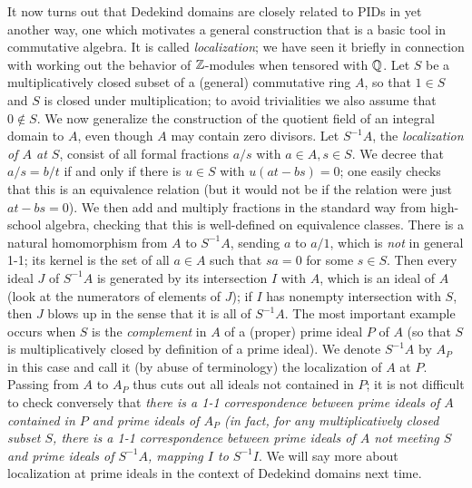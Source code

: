 \documentclass[10pt]{article}
\begin{document}
It now turns out that Dedekind domains are closely related to PIDs in
yet another way, one which motivates a general construction that is a
basic tool in commutative algebra. It is called {\sl localization}; we
have seen it briefly in connection with working out the behavior of
$\Bbb Z$-modules when tensored with $\Bbb Q$. Let $S$ be a
multiplicatively closed subset of a (general) commutative ring $A$, so
that $1\in S$ and $S$ is closed under multiplication; to avoid
trivialities we also assume that $0\notin S$. We now generalize the
construction of the quotient field of an integral domain to $A$, even
though $A$ may contain zero divisors. Let $S^{-1}A$, the {\sl
  localization of $A$ at $S$}, consist of all formal fractions $a/s$
with $a\in A, s\in S$. We decree that $a/s = b/t$ if and only if there
is $u\in S$ with $u(at - bs) = 0$; one easily checks that this is an
equivalence relation (but it would not be if the relation were just $at
- bs = 0$). We then add and multiply fractions in the standard way from
high-school algebra, checking that this is well-defined on equivalence
classes. There is a natural homomorphism from $A$ to $S^{-1}A$, sending
$a$ to $a/1$, which is {\sl not} in general 1-1; its kernel is the set
of all $a\in A$ such that $sa = 0$ for some $s\in S$. Then every ideal
$J$ of $S^{-1}A$ is generated by its intersection $I$ with $A$, which is
an ideal of $A$ (look at the numerators of elements of $J$); if $I$ has
nonempty intersection with $S$, then $J$ blows up in the sense that it
is all of $S^{-1}A$. The most important example occurs when $S$ is the
{\sl complement} in $A$ of a (proper) prime ideal $P$ of $A$ (so that
$S$ is multiplicatively closed by definition of a prime ideal). We
denote $S^{-1}A$ by $A_P$ in this case and call it (by abuse of
terminology) the localization of $A$ at $P$. Passing from $A$ to $A_P$
thus cuts out all ideals not contained in $P$; it is not difficult to
check conversely that {\sl there is a 1-1 correspondence between prime
  ideals of $A$ contained in $P$ and prime ideals of $A_P$ (in fact, for
  any multiplicatively closed subset $S$, there is a 1-1 correspondence
  between prime ideals of $A$ not meeting $S$ and prime ideals of
  $S^{-1}A$, mapping $I$ to $S^{-1}I$}. We will say more about
localization at prime ideals in the context of Dedekind domains next
time.
\end{document}
